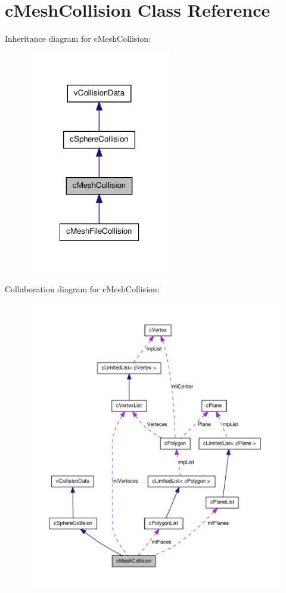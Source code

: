 \hypertarget{classc_mesh_collision}{
\section{cMeshCollision Class Reference}
\label{classc_mesh_collision}
}


Inheritance diagram for cMeshCollision:
\nopagebreak
\begin{figure}[H]
\begin{center}
\leavevmode
\includegraphics[width=178pt]{classc_mesh_collision__inherit__graph}
\end{center}
\end{figure}


Collaboration diagram for cMeshCollision:
\nopagebreak
\begin{figure}[H]
\begin{center}
\leavevmode
\includegraphics[width=400pt]{classc_mesh_collision__coll__graph}
\end{center}
\end{figure}
